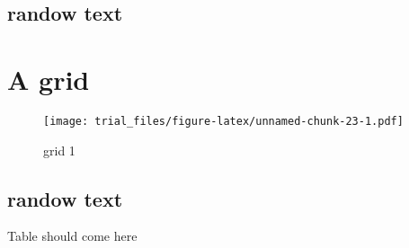 \documentclass[]{article}
\begin{document}
\subsection{randow text}\label{randow-text-13}

\lipsum

\section{A grid}\label{a-grid-6}

\begin{figure}[htbp]
\centering
\texttt{[image: trial\_files/figure-latex/unnamed-chunk-23-1.pdf]}
\caption{grid 1}
\end{figure}

\subsection{randow text}\label{randow-text-14}

\lipsum

Table should come here
\end{document}
